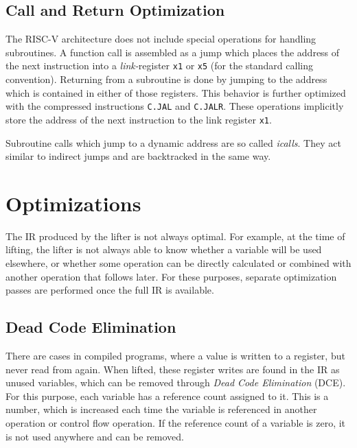 \documentclass[course=eragp]{aspdoc}
\begin{document}
\subsection{Call and Return Optimization}
The RISC-V architecture does not include special operations for handling subroutines. A function call
is assembled as a jump which places the address of the next instruction into a \emph{link-}register
\texttt{x1} or \texttt{x5} (for the standard calling convention).\cite{rvspec} Returning from a
subroutine is done by jumping to the address which is contained in either of those registers. This
behavior is further optimized with the compressed instructions \texttt{C.JAL} and
\texttt{C.JALR}. These operations implicitly store the address of the next instruction
to the link register \texttt{x1}.\cite{rvspec}

\par

Subroutine calls which jump to a dynamic address are so called \emph{icalls}. They act
similar to indirect jumps and are backtracked in the same way.

\section{Optimizations}\label{sec:optimizations}

The IR produced by the lifter is not always optimal. For example, at the time of lifting, the lifter is not always able
to know whether a variable will be used elsewhere, or whether some operation can be directly calculated or combined with
another operation that follows later. For these purposes, separate optimization passes are performed once the full IR is
available.

\subsection{Dead Code Elimination}\label{dead_code_elimination}

There are cases in compiled programs, where a value is written to a register, but never read from again.
When lifted, these register writes are found in the IR as unused variables, which can be removed through \emph{Dead Code
    Elimination} (DCE). For this purpose, each variable has a reference count assigned to it. This is a number, which is
increased each time the variable is referenced in another operation or control flow operation. If the reference count of
a variable is zero, it is not used anywhere and can be removed.
\end{document}
